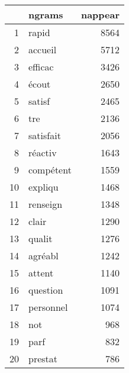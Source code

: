 \begin{tabular}{|r|l|r|}
  \hline
 & ngrams & nappear \\ 
  \hline
1 & rapid & 8564 \\ 
  2 & accueil & 5712 \\ 
  3 & efficac & 3426 \\ 
  4 & écout & 2650 \\ 
  5 & satisf & 2465 \\ 
  6 & tre & 2136 \\ 
  7 & satisfait & 2056 \\ 
  8 & réactiv & 1643 \\ 
  9 & compétent & 1559 \\ 
  10 & expliqu & 1468 \\ 
  11 & renseign & 1348 \\ 
  12 & clair & 1290 \\ 
  13 & qualit & 1276 \\ 
  14 & agréabl & 1242 \\ 
  15 & attent & 1140 \\ 
  16 & question & 1091 \\ 
  17 & personnel & 1074 \\ 
  18 & not & 968 \\ 
  19 & parf & 832 \\ 
  20 & prestat & 786 \\ 
   \hline
\end{tabular}
